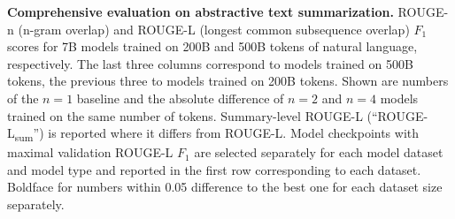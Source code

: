 \begin{table}[b!]
\centering
\caption{\textbf{Comprehensive evaluation on abstractive text summarization.} 
ROUGE-n (n-gram overlap) and ROUGE-L (longest common subsequence overlap) 
$F_1$ scores for 7B models trained on 200B and 500B tokens of natural language, respectively. The last three columns correspond to models trained on 500B tokens, the previous three to models trained on 200B tokens. Shown are numbers of the $n=1$ baseline and the absolute difference of $n=2$ and $n=4$ models trained on the same number of tokens. Summary-level ROUGE-L (``ROUGE-L\textsubscript{sum}'') is reported where it differs from ROUGE-L. Model checkpoints with maximal validation ROUGE-L $F_1$ are selected separately for each model dataset and model type and reported in the first row corresponding to each dataset. Boldface for numbers within 0.05 difference to the best one for each dataset size separately.}


\end{table}
